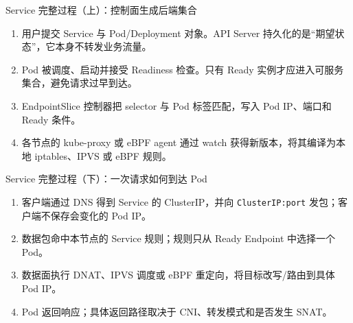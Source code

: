 \documentclass[UTF8,fontset=none,aspectratio=169,10pt]{beamer}
\begin{document}
\begin{frame}{Service 完整过程（上）：控制面生成后端集合}
\begin{enumerate}
  \item[$t_0$] 用户提交 Service 与 Pod/Deployment 对象。API Server 持久化的是“期望状态”，它本身不转发业务流量。
  \item[$t_1$] Pod 被调度、启动并接受 Readiness 检查。只有 Ready 实例才应进入可服务集合，避免请求过早到达。
  \item[$t_2$] EndpointSlice 控制器把 selector 与 Pod 标签匹配，写入 Pod IP、端口和 Ready 条件。
  \item[$t_3$] 各节点的 kube-proxy 或 eBPF agent 通过 watch 获得新版本，将其编译为本地 iptables、IPVS 或 eBPF 规则。
\end{enumerate}
\vfill
{}
\end{frame}

\begin{frame}{Service 完整过程（下）：一次请求如何到达 Pod}
\begin{enumerate}
  \item[$t_4$] 客户端通过 DNS 得到 Service 的 ClusterIP，并向 \texttt{ClusterIP:port} 发包；客户端不保存会变化的 Pod IP。
  \item[$t_5$] 数据包命中本节点的 Service 规则；规则只从 Ready Endpoint 中选择一个 Pod。
  \item[$t_6$] 数据面执行 DNAT、IPVS 调度或 eBPF 重定向，将目标改写/路由到具体 Pod IP。
  \item[$t_7$] Pod 返回响应；具体返回路径取决于 CNI、转发模式和是否发生 SNAT。
\end{enumerate}
\vfill
{}
\end{frame}
\end{document}
